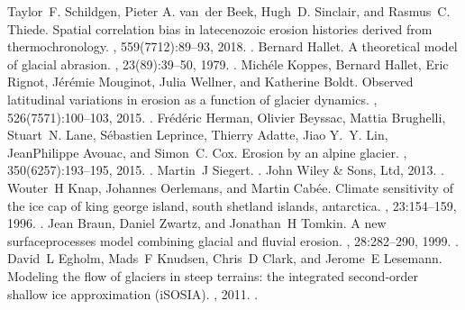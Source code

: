 \documentclass[letterpaper,10pt,english]{jupyterBook}
\begin{document}
\begin{sphinxthebibliography}{10}
\sphinxAtStartPar
Taylor F. Schildgen, Pieter A. van der Beek, Hugh D. Sinclair, and Rasmus C. Thiede. Spatial correlation bias in late\sphinxhyphen{}cenozoic erosion histories derived from thermochronology. , 559(7712):89–93, 2018. .
\sphinxAtStartPar
Bernard Hallet. A theoretical model of glacial abrasion. , 23(89):39–50, 1979. .
\sphinxAtStartPar
Michéle Koppes, Bernard Hallet, Eric Rignot, Jérémie Mouginot, Julia Wellner, and Katherine Boldt. Observed latitudinal variations in erosion as a function of glacier dynamics. , 526(7571):100–103, 2015. .
\sphinxAtStartPar
Frédéric Herman, Olivier Beyssac, Mattia Brughelli, Stuart N. Lane, Sébastien Leprince, Thierry Adatte, Jiao Y. Y. Lin, Jean\sphinxhyphen{}Philippe Avouac, and Simon C. Cox. Erosion by an alpine glacier. , 350(6257):193–195, 2015. .
\sphinxAtStartPar
Martin J Siegert. . John Wiley \& Sons, Ltd, 2013. .
\sphinxAtStartPar
Wouter H Knap, Johannes Oerlemans, and Martin Cabée. Climate sensitivity of the ice cap of king george island, south shetland islands, antarctica. , 23:154–159, 1996. .
\sphinxAtStartPar
Jean Braun, Daniel Zwartz, and Jonathan H Tomkin. A new surface\sphinxhyphen{}processes model combining glacial and fluvial erosion. , 28:282–290, 1999. .
\sphinxAtStartPar
David L Egholm, Mads F Knudsen, Chris D Clark, and Jerome E Lesemann. Modeling the flow of glaciers in steep terrains: the integrated second‐order shallow ice approximation (iSOSIA). , 2011. .

\end{sphinxthebibliography}
\end{document}
